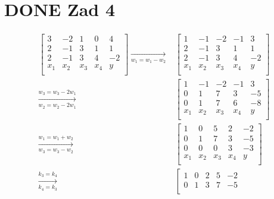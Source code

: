 \documentclass[11pt]{article}
\begin{document}
\section{{\bfseries\sffamily DONE} Zad 4}
\label{sec:orgb220749}
\begin{align*}
  \left[
  \begin{array}{cccc|c}
    3  & -2 & 1 & 0 & 4\\
    2  & -1 & 3 & 1 & 1 \\
    2 & -1 & 3 & 4  & -2\\
    x_1 & x_2 & x_3 & x_4  & y\\
  \end{array}
  \right]
  \xrightarrow[w_{1} = w_{1} - w_{2}]{}
       & \left[
         \begin{array}{cccc|c}
           1  & -1 & -2 & -1 & 3\\
           2  & -1 & 3 & 1 & 1 \\
           2 & -1 & 3 & 4  & -2\\
           x_1 & x_2 & x_3 & x_4  & y\\
         \end{array}
  \right]
  \\
  \xrightarrow[w_{2} = w_{2} - 2 w_{1} ]{w_3 = w_3 - 2 w_1}
       & \left[
         \begin{array}{cccc|c}
           1  & -1 & -2 & -1 & 3\\
           0  & 1 & 7 & 3 & -5 \\
           0 & 1 & 7  & 6 & -8 \\
           x_1 & x_2 & x_3 & x_4  & y\\
         \end{array}
  \right]
  \\
  \xrightarrow[w_{3} = w_{3} - w_{2}]{w_{1} = w_{1} + w_{2}}
       &\left[
         \begin{array}{cccc|c}
           1 & 0 & 5 & 2 & -2\\
           0 & 1 & 7 & 3 & -5\\
           0 & 0 & 0 & 3 & -3\\
           x_1 & x_2 & x_3 & x_4  & y\\
         \end{array}
  \right]
  \\
  \xrightarrow[k_{4} = k_{3}]{k_{3} = k_{4}}
       &\left[
         \begin{array}{cccc|c}
           1 & 0 & 2 & 5 & -2\\
           0 & 1 & 3 & 7 & -5\\

\end{array}
\end{align*}
\end{document}

